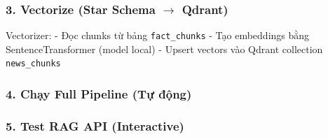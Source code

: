 \hypertarget{vectorize-star-schema-rightarrow-qdrant}{%
\subsubsection{\texorpdfstring{3. Vectorize (Star Schema \(\rightarrow\)
Qdrant)}{3. Vectorize (Star Schema \textbackslash rightarrow Qdrant)}}}

\begin{Shaded}
\begin{Highlighting}[]
\end{Highlighting}
\end{Shaded}

Vectorizer: - Đọc chunks từ bảng \texttt{fact\_chunks} - Tạo embeddings
bằng SentenceTransformer (model local) - Upsert vectors vào Qdrant
collection \texttt{news\_chunks}

\hypertarget{chux1ea1y-full-pipeline-tux1ef1-ux111ux1ed9ng}{%
\subsubsection{4. Chạy Full Pipeline (Tự
động)}}

\begin{Shaded}
\begin{Highlighting}[]
\end{Highlighting}
\end{Shaded}

\hypertarget{test-rag-api-interactive}{%
\subsubsection{5. Test RAG API
(Interactive)}}

\begin{Shaded}
\begin{Highlighting}[]
 

\end{Highlighting}
\end{Shaded}

